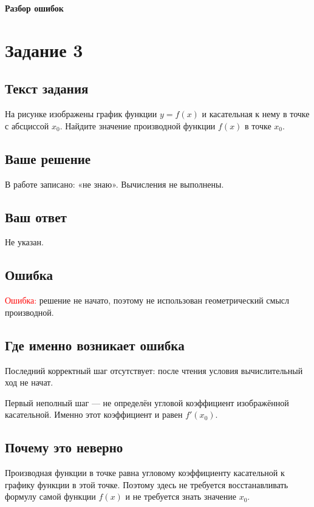 \documentclass[12pt,a4paper]{article}
\begin{document}
\newpage
\thispagestyle{empty}
\vspace*{\fill}
\begin{center}
{\Huge\bfseries Разбор ошибок}
\end{center}
\vspace*{\fill}

\newpage
{}\label{task:3}
\section*{Задание 3}

\subsection*{Текст задания}
На рисунке изображены график функции $y=f(x)$ и касательная к нему в точке с абсциссой $x_0$. Найдите значение производной функции $f(x)$ в точке $x_0$.

\subsection*{Ваше решение}
В работе записано: «не знаю». Вычисления не выполнены.

\subsection*{Ваш ответ}
Не указан.

\subsection*{Ошибка}
\textcolor{red}{Ошибка:} решение не начато, поэтому не использован геометрический смысл производной.

\subsection*{Где именно возникает ошибка}
Последний корректный шаг отсутствует: после чтения условия вычислительный ход не начат.

Первый неполный шаг --- не определён угловой коэффициент изображённой касательной. Именно этот коэффициент и равен $f'(x_0)$.

\subsection*{Почему это неверно}
Производная функции в точке равна угловому коэффициенту касательной к графику функции в этой точке. Поэтому здесь не требуется восстанавливать формулу самой функции $f(x)$ и не требуется знать значение $x_0$.
\end{document}
